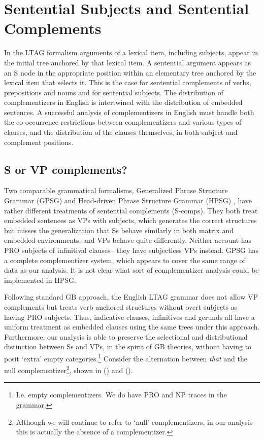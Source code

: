 
\section{Sentential Subjects and Sentential Complements}
\label{scomps-section}

In the LTAG formalism arguments of a lexical item, including
subjects, appear in the initial tree anchored by that lexical item.  A
sentential argument appears as an S node in the appropriate position
within an elementary tree anchored by the lexical item that selects
it. This is the case for sentential complements of verbs, prepositions
and nouns and for sentential subjects. The distribution of
complementizers in English is intertwined with the distribution of
embedded sentences.  A successful analysis of complementizers in
English must handle both the co-occurrence restrictions between
complementizers and various types of clauses, and the distribution of
the clauses themselves, in both subject and complement positions.

\subsection{S or VP complements?}
 
Two comparable grammatical formalisms, Generalized Phrase Structure
Grammar (GPSG) \cite{gazdar85} and Head-driven Phrase Structure
Grammar (HPSG) \cite{pollard87}, have rather different treatments of
sentential complements (S-comps).  They both treat embedded sentences
as VPs with subjects, which generates the correct structures but
misses the generalization that Ss behave similarly in both matrix and
embedded environments, and VPs behave quite differently.  Neither
account has PRO subjects of infinitival clauses-- they have
subjectless VPs instead.  GPSG has a complete complementizer system,
which appears to cover the same range of data as our analysis.  It is
not clear what sort of complementizer analysis could be implemented in
HPSG.

Following standard GB approach, the English LTAG grammar does not
allow VP complements but treats verb-anchored structures without overt
subjects as having PRO subjects. Thus, indicative clauses, infinitives
and gerunds all have a uniform treatment as embedded clauses using the
same trees under this approach. Furthermore, our analysis is able to
preserve the selectional and distributional distinction between Ss and
VPs, in the spirit of GB theories, without having to posit `extra'
empty categories.\footnote{I.e. empty complementizers. We do have PRO
and NP traces in the grammar.} Consider the alternation between {\it
that} and the null complementizer\footnote{Although we will continue
to refer to `null' complementizers, in our analysis this is actually
the absence of a complementizer.}, shown in () and ().


